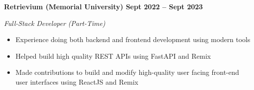 \vspace{0.1cm}
\textbf{Retrievium (Memorial University) \hfill Sept 2022 -- Sept 2023} \par
\textit{Full-Stack Developer (Part-Time)} \par
\begin{itemize}
    \item Experience doing both backend and frontend development using modern tools
    \item Helped build high quality REST APIs using FastAPI and Remix
    \item Made contributions to build and modify high-quality user facing front-end user interfaces using ReactJS and Remix
\end{itemize} \par